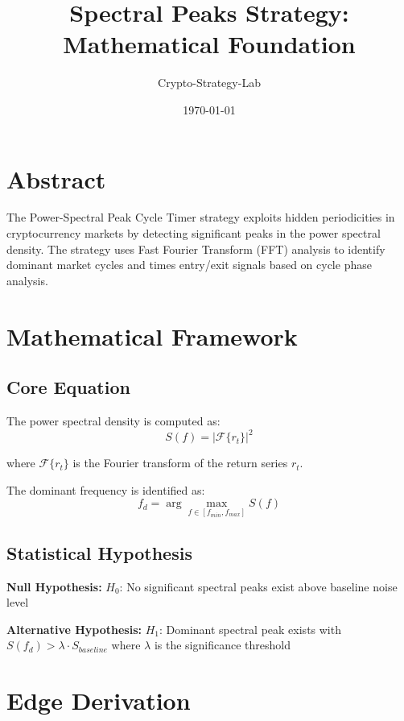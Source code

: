 \documentclass{article}
\title{Spectral Peaks Strategy: Mathematical Foundation}
\author{Crypto-Strategy-Lab}
\date{\today}
\begin{document}
\maketitle

\section{Abstract}

The Power-Spectral Peak Cycle Timer strategy exploits hidden periodicities in cryptocurrency markets by detecting significant peaks in the power spectral density. The strategy uses Fast Fourier Transform (FFT) analysis to identify dominant market cycles and times entry/exit signals based on cycle phase analysis.

\section{Mathematical Framework}

\subsection{Core Equation}

The power spectral density is computed as:
\begin{equation}
S(f) = |\mathcal{F}\{r_t\}|^2
\end{equation}

where $\mathcal{F}\{r_t\}$ is the Fourier transform of the return series $r_t$.

The dominant frequency is identified as:
\begin{equation}
f_d = \arg\max_{f \in [f_{min}, f_{max}]} S(f)
\end{equation}

\subsection{Statistical Hypothesis}

\textbf{Null Hypothesis:} $H_0$: No significant spectral peaks exist above baseline noise level

\textbf{Alternative Hypothesis:} $H_1$: Dominant spectral peak exists with $S(f_d) > \lambda \cdot S_{baseline}$ where $\lambda$ is the significance threshold

\section{Edge Derivation}
\end{document}
